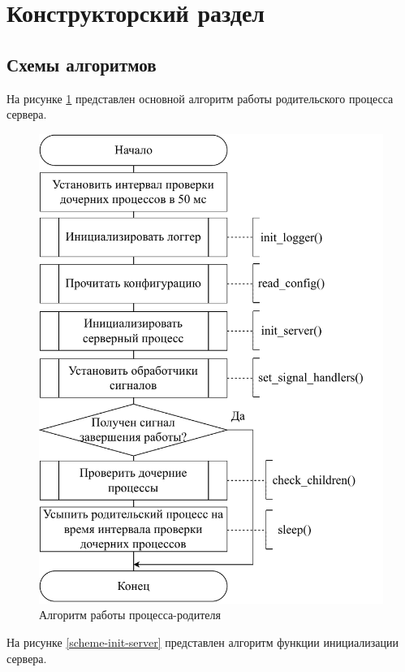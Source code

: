 \section{Конструкторский раздел}

\subsection{Схемы алгоритмов}

На рисунке \ref{scheme-main} представлен основной алгоритм работы родительского процесса сервера.

\begin{figure}[H]
	\centering
	\includegraphics[scale=0.9]{img/main.pdf}
	\caption{Алгоритм работы процесса-родителя}
	\label{scheme-main}
\end{figure}

\newpage

На рисунке \ref{scheme-init-server} представлен алгоритм функции инициализации сервера.

